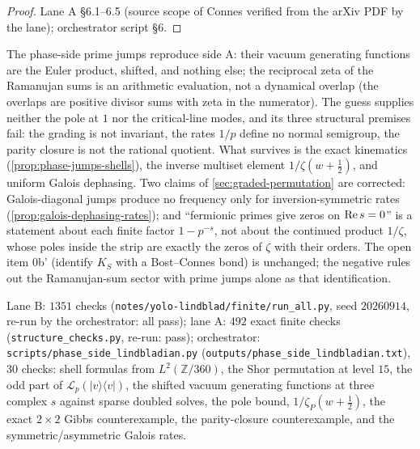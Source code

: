 \begin{proof}
Lane A \S6.1--6.5 (source scope of Connes verified from the arXiv PDF by the lane); orchestrator script \S6.
\end{proof}

\begin{observation}
\label{obs:phase-side-verdict}
The phase-side prime jumps reproduce side A: their vacuum generating functions are the Euler product,
shifted, and nothing else; the reciprocal zeta of the Ramanujan sums is an arithmetic evaluation, not
a dynamical overlap (the overlaps are positive divisor sums with zeta in the numerator). The guess
supplies neither the pole at $1$ nor the critical-line modes, and its three structural premises fail:
the grading is not invariant, the rates $1/p$ define no normal semigroup, the parity closure is not
the rational quotient. What survives is the exact kinematics (\cref{prop:phase-jumps-shells}), the
inverse multiset element $1/\zeta(w+\tfrac12)$, and uniform Galois dephasing. Two claims of
\cref{sec:graded-permutation} are corrected: Galois-diagonal jumps produce no frequency only for
inversion-symmetric rates (\cref{prop:galois-dephasing-rates}); and ``fermionic primes give zeros on
$\operatorname{Re} s = 0$'' is a statement about each finite factor $1-p^{-s}$, not about the continued product
$1/\zeta$, whose poles inside the strip are exactly the zeros of $\zeta$ with their orders. The
open item 0b' (identify $K_S$ with a Bost--Connes bond) is unchanged; the negative rules out the
Ramanujan-sum sector with prime jumps alone as that identification.
\end{observation}

\begin{numerical}
\label{num:phase-side-lindbladian}
Lane B: $1351$ checks (\texttt{notes/yolo-lindblad/finite/run\_all.py}, seed $20260914$, re-run by the
orchestrator: all pass); lane A: $492$ exact finite checks (\texttt{structure\_checks.py}, re-run: pass);
orchestrator: \texttt{scripts/phase\_side\_lindbladian.py} (\texttt{outputs/phase\_side\_lindbladian.txt}),
$30$ checks: shell formulas from $L^2(\mathbb Z/360)$, the Shor permutation at level $15$, the odd part of
$\mathcal L_p(|v\rangle\langle v|)$, the shifted vacuum generating functions at three complex $s$ against
sparse doubled solves, the pole bound, $1/\zeta_P(w+\tfrac12)$, the exact $2\times2$ Gibbs counterexample,
the parity-closure counterexample, and the symmetric/asymmetric Galois rates.
\end{numerical}
